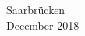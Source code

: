 \begin{titlepage}
\begin{center}




Saarbr\"ucken\\ 
December 2018
\end{center}


%

\end{titlepage}
